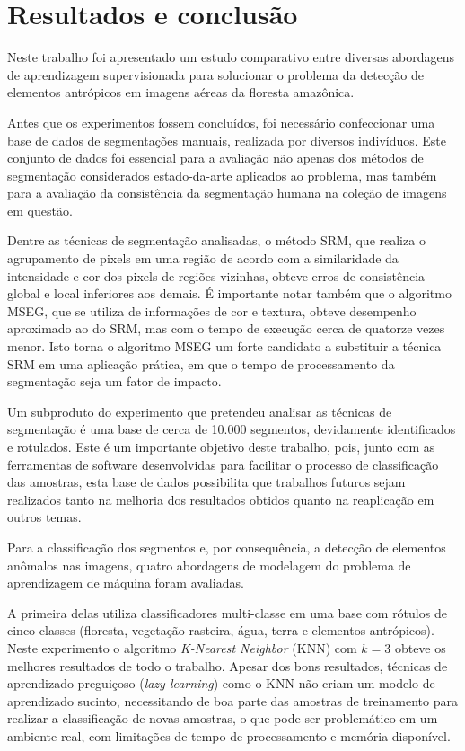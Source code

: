 \chapter{Resultados e conclusão}\label{cap:conclusao}

Neste trabalho foi apresentado um estudo comparativo entre diversas abordagens de aprendizagem supervisionada para solucionar o problema da detecção de elementos antrópicos em imagens aéreas da floresta amazônica.

Antes que os experimentos fossem concluídos, foi necessário confeccionar uma base de dados de segmentações manuais, realizada por diversos indivíduos. Este conjunto de dados foi essencial para a avaliação não apenas dos métodos de segmentação considerados estado-da-arte aplicados ao problema, mas também para a avaliação da consistência da segmentação humana na coleção de imagens em questão.

Dentre as técnicas de segmentação analisadas, o método SRM, que realiza o agrupamento de pixels em uma região de acordo com a similaridade da intensidade e cor dos pixels de regiões vizinhas, obteve erros de consistência global e local inferiores aos demais. É importante notar também que o algoritmo MSEG, que se utiliza de informações de cor e textura, obteve desempenho aproximado ao do SRM, mas com o tempo de execução cerca de quatorze vezes menor. Isto torna o algoritmo MSEG um forte candidato a substituir a técnica SRM em uma aplicação prática, em que o tempo de processamento da segmentação seja um fator de impacto.

Um subproduto do experimento que pretendeu analisar as técnicas de segmentação é uma base de cerca de 10.000 segmentos, devidamente identificados e rotulados. Este é um importante objetivo deste trabalho, pois, junto com as ferramentas de software desenvolvidas para facilitar o processo de classificação das amostras, esta base de dados possibilita que trabalhos futuros sejam realizados tanto na melhoria dos resultados obtidos quanto na reaplicação em outros temas.

Para a classificação dos segmentos e, por consequência, a detecção de elementos anômalos nas imagens, quatro abordagens de modelagem do problema de aprendizagem de máquina foram avaliadas.

A primeira delas utiliza classificadores multi-classe em uma base com rótulos de cinco classes (floresta, vegetação rasteira, água, terra e elementos antrópicos). Neste experimento o algoritmo \textit{K-Nearest Neighbor} (KNN) com $k=3$ obteve os melhores resultados de todo o trabalho. Apesar dos bons resultados, técnicas de aprendizado preguiçoso (\textit{lazy learning}) como o KNN não criam um modelo de aprendizado sucinto, necessitando de boa parte das amostras de treinamento para realizar a classificação de novas amostras, o que pode ser problemático em um ambiente real, com limitações de tempo de processamento e memória disponível.

